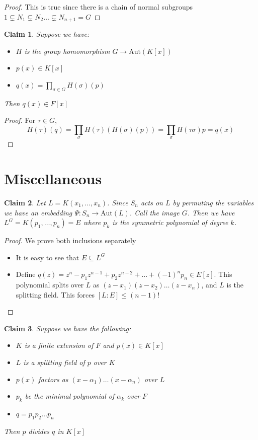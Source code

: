 \documentclass{article}
\newtheorem{claim}{Claim}
\begin{document}
\begin{proof}
  This is true since there is a chain of normal subgroups $1 \subsetneq N_1 \subsetneq N_2 \dots \subsetneq N_{n+1} = G$
\end{proof}

\begin{claim}
  Suppose we have:
  \begin{itemize}
    \item $H$ is the group homomorphism $G \to \text{Aut}(K[x])$
    \item $p(x) \in K[x]$
    \item $q(x) = \prod_{\sigma \in G} H(\sigma)(p)$
  \end{itemize}

  Then $q(x) \in F[x]$
\end{claim}

\begin{proof}
  For $\tau \in G$,
  \[H(\tau)(q) = \prod_\sigma H(\tau)(H(\sigma)(p)) = \prod_\sigma H(\tau \sigma) p = q(x)\]
\end{proof}

\section{Miscellaneous}

\begin{claim}
  Let $L=K(x_1,\dots,x_n)$.
  Since $S_n$ acts on $L$ by permuting the variables we have an embedding $\Psi:S_n \to \text{Aut}(L)$. 
  Call the image $G$. 
  Then we have $L^G = K(p_1,\dots,p_n) = E$ where $p_k$ is the symmetric polynomial of degree $k$.
\end{claim}

\begin{proof}
    We prove both inclusions separately
    \begin{itemize}
      \item It is easy to see that $E \subseteq L^G$
      \item Define $q(z) = z^n - p_1z^{n-1} + p_2z^{n-2} + \dots + (-1)^n p_n \in E[z]$. 
            This polynomial splits over $L$ as $(z-x_1)(z-x_2)\dots(z-x_n)$, and $L$ is the splitting field. 
            This forces $[L:E] \leq (n-1)!$
    \end{itemize}
\end{proof}

\begin{claim}
  Suppose we have the following:
  \begin{itemize}
    \item $K$ is a finite extension of $F$ and $p(x) \in K[x]$
    \item $L$ is a splitting field of $p$ over $K$
    \item $p(x)$ factors as $(x-\alpha_1) \dots (x-\alpha_n)$ over $L$
    \item $p_k$ be the minimal polynomial of $\alpha_k$ over $F$
    \item $q= p_1 p_2 \dots p_n$
  \end{itemize}

  Then $p$ divides $q$ in $K[x]$
\end{claim}
\end{document}
